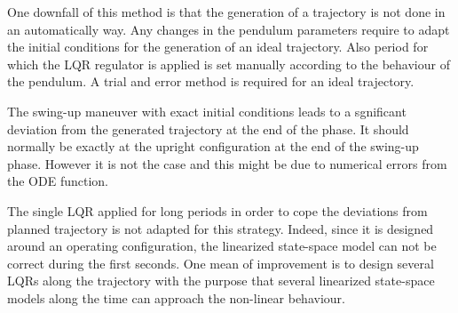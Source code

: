 \documentclass[a4paper,12pt]{article}
\begin{document}
One downfall of this method is that the generation of a trajectory is not done in an automatically way. Any changes in the pendulum parameters require to adapt the initial conditions for the generation of an ideal trajectory. Also period for which the LQR regulator is applied is set manually according to the behaviour of the pendulum. A trial and error method is required for an ideal trajectory.

The swing-up maneuver with exact initial conditions leads to a sgnificant deviation from the generated trajectory at the end of the phase. It should normally be exactly at the upright configuration at the end of the swing-up phase. However it is not the case and this might be due to numerical errors from the ODE function.

The single LQR applied for long periods in order to cope the deviations from planned trajectory is not adapted for this strategy. Indeed, since it is designed around an operating configuration, the linearized state-space model can not be correct during the first seconds. One mean of improvement is to design several LQRs along the trajectory with the purpose that several linearized state-space models along the time can approach the non-linear behaviour.

\newpage
\appendix
\end{document}

